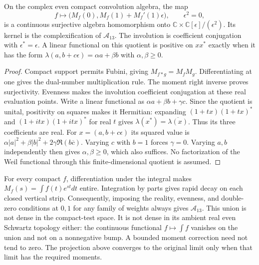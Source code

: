 \begin{proposition}
On the complex even compact convolution algebra, the map
\[
 f\longmapsto\bigl(M_f(0),M_f(1)+M_f'(1)\epsilon\bigr),
 \qquad \epsilon^2=0,
\]
is a continuous surjective algebra homomorphism onto
$\mathbb C\times\mathbb C[\epsilon]/(\epsilon^2)$.
Its kernel is the complexification of $\mathscr A_{13}$.
The involution is coefficient conjugation with $\epsilon^*=\epsilon$.
A linear functional on this quotient is positive on $xx^*$
exactly when it has the form
$\lambda(a,b+c\epsilon)=\alpha a+\beta b$ with
$\alpha,\beta\ge0$.
\end{proposition}
\begin{proof}
Compact support permits Fubini, giving $M_{f*g}=M_fM_g$.
Differentiating at one gives the dual-number multiplication rule.
The moment right inverse proves surjectivity. Evenness makes the
involution coefficient conjugation at these real evaluation points.
Write a linear functional as $\alpha a+\beta b+\gamma c$.
Since the quotient is unital, positivity on squares makes it
Hermitian: expanding $(1+t x)(1+t x)^*$ and $(1+itx)(1+itx)^*$
for real $t$ gives $\lambda(x^*)=\overline{\lambda(x)}$.
Thus its three coefficients are real.
For $x=(a,b+c\epsilon)$ its squared value is
$\alpha|a|^2+\beta|b|^2+2\gamma\Re(b\overline c)$.
Varying $c$ with $b=1$ forces $\gamma=0$.
Varying $a,b$ independently then gives $\alpha,\beta\ge0$,
which also suffices. No factorization of the Weil functional
through this finite-dimensional quotient is assumed.
\end{proof}

For every compact $f$, differentiation under the integral makes
$M_f(s)=\int f(t)e^{st}dt$ entire. Integration by parts gives rapid
decay on each closed vertical strip. Consequently, imposing the
reality, evenness, and double-zero conditions at $0,1$ for any
family of weights always gives $\mathscr A_{13}$. This union is
not dense in the compact-test space. It is not dense in its ambient
real even Schwartz topology either: the continuous functional
$f\mapsto\int f$ vanishes on the union and not on a nonnegative bump.
A bounded moment correction need not tend to zero. The projection
above converges to the original limit only when that limit has the
required moments.


